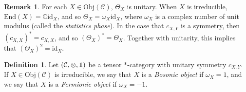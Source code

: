 \documentclass[11pt]{article}
\theoremstyle{definition}
\theoremstyle{definition}
\newtheorem{defn}[thm]{Definition}
\newtheorem{note}[thm]{Remark}
\theoremstyle{remark}
\newcommand{\Obj}{\mathrm{Obj}}
\def\2#1{{\mathcal #1}}
\def\7#1{{\mathbb #1}}
\def\1#1{{\bf #1}}
\def\om{\omega} \def\Om{\Omega} \def\dd{\partial} \def\D{\Delta}
\newcommand{\End}{\mathrm{End}}
\def\id{\mathrm{id}}
\begin{document}
\begin{note} For each $X\in \Obj (\2C )$, $\Theta _X$ is unitary.  When $X$ is
  irreducible, $\End (X)=\7C \id _X$, and so $\Theta _X =\om _X\id _X$, where $\om
  _X$ is a complex number of unit modulus (called the \emph{statistics phase}).  In
  the case that $c_{X,Y}$ is a symmetry, then $(c_{X,X})^*=c_{X,X}$, and so $(\Theta
  _X)^*=\Theta _X$.  Together with unitarity, this implies that $(\Theta _X)^2=\id
  _X$.
\end{note}

\begin{defn} Let $(\2C ,\otimes ,\11 )$ be a tensor $*$-category with unitary
  symmetry $c_{X,Y}$.  If $X\in \Obj (\2C )$ is irreducible, we say that $X$ is a
  \emph{Bosonic object} if $\om _X=1$, and we say that $X$ is a \emph{Fermionic
    object} if $\om _X=-1$.  \end{defn}
\end{document}
